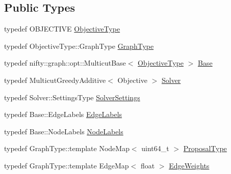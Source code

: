 \subsection*{Public Types}
\begin{DoxyCompactItemize}
\item 
typedef O\+B\+J\+E\+C\+T\+I\+VE \hyperlink{classnifty_1_1graph_1_1opt_1_1common_1_1GreedyAdditiveMulticutProposals_a3e3e6166f8860e862acf00a9d134af54}{Objective\+Type}
\item 
typedef Objective\+Type\+::\+Graph\+Type \hyperlink{classnifty_1_1graph_1_1opt_1_1common_1_1GreedyAdditiveMulticutProposals_a9130fd4fe68ba06febed6f9472e16b2d}{Graph\+Type}
\item 
typedef nifty\+::graph\+::opt\+::\+Multicut\+Base$<$ \hyperlink{classnifty_1_1graph_1_1opt_1_1common_1_1GreedyAdditiveMulticutProposals_a3e3e6166f8860e862acf00a9d134af54}{Objective\+Type} $>$ \hyperlink{classnifty_1_1graph_1_1opt_1_1common_1_1GreedyAdditiveMulticutProposals_af4cc9116e5172d0f8b95d1d059bf437d}{Base}
\item 
typedef Multicut\+Greedy\+Additive$<$ Objective $>$ \hyperlink{classnifty_1_1graph_1_1opt_1_1common_1_1GreedyAdditiveMulticutProposals_ad034fe9ab2c958d276ff06aeb2c39122}{Solver}
\item 
typedef Solver\+::\+Settings\+Type \hyperlink{classnifty_1_1graph_1_1opt_1_1common_1_1GreedyAdditiveMulticutProposals_a41bd612b5b820441e0e2bbb3c2675511}{Solver\+Settings}
\item 
typedef Base\+::\+Edge\+Labels \hyperlink{classnifty_1_1graph_1_1opt_1_1common_1_1GreedyAdditiveMulticutProposals_a09e4cb8aea3e3aae593a050b1c55430e}{Edge\+Labels}
\item 
typedef Base\+::\+Node\+Labels \hyperlink{classnifty_1_1graph_1_1opt_1_1common_1_1GreedyAdditiveMulticutProposals_a9efc518b323ff1019cb348d568557291}{Node\+Labels}
\item 
typedef Graph\+Type\+::template Node\+Map$<$ uint64\+\_\+t $>$ \hyperlink{classnifty_1_1graph_1_1opt_1_1common_1_1GreedyAdditiveMulticutProposals_a1a51f12b52812e4a7942bcfaa2d35d05}{Proposal\+Type}
\item 
typedef Graph\+Type\+::template Edge\+Map$<$ float $>$ \hyperlink{classnifty_1_1graph_1_1opt_1_1common_1_1GreedyAdditiveMulticutProposals_a382392cabd839d5b3478b3eaae47c596}{Edge\+Weights}
\end{DoxyCompactItemize}
